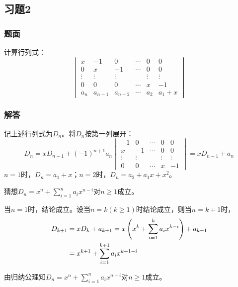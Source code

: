 \documentclass[9pt,xcolor=svgnames]{beamer} %
\begin{document}
\subsection*{习题2}
\begin{frame}
    \frametitle{题面}
    计算行列式：
    \begin{equation*}
        \begin{vmatrix}
            x      & -1      & 0       & \cdots & 0      & 0      \\
            0      & x       & -1      & \cdots & 0      & 0      \\
            \vdots & \vdots  & \vdots  &        & \vdots & \vdots \\
            0      & 0       & 0       & \cdots & x      & -1     \\
            a_n    & a_{n-1} & a_{n-2} & \cdots & a_2    & a_1+x
        \end{vmatrix}
    \end{equation*}
\end{frame}
\begin{frame}
    \frametitle{解答}

    记上述行列式为\(D_n\)。将\(D_n\)按第一列展开：
    \begin{equation*}
        D_n  =xD_{n-1}+(-1)^{n+1}a_n
        \begin{vmatrix}
            -1     & 0      & \cdots & 0      & 0      \\
            x      & -1     & \cdots & 0      & 0      \\
            \vdots & \vdots &        & \vdots & \vdots \\
            0      & 0      & \cdots & x      & -1
        \end{vmatrix}
        =xD_{n-1}+a_n
    \end{equation*}
    \(n=1\)时，\(D_n=a_1+x\)；\(n=2\)时，\(D_n=a_2+a_1x+x^2\)。

    猜想\(D_n=x^n+\sum_{i=1}^{n}a_ix^{n-i}\)对\(n\geq1\)成立。

    当\(n=1\)时，结论成立。设当\(n=k\)\((k\geq1)\)时结论成立，则当\(n=k+1\)时，
    \begin{align*}
        D_{k+1} & =xD_k+a_{k+1}=x\left( x^k+\sum_{i=1}^{k}a_ix^{k-i} \right)+a_{k+1} \\
                & =x^{k+1}+\sum_{i=1}^{k+1}a_ix^{k+1-i}
    \end{align*}

    由归纳公理知\(D_n=x^n+\sum_{i=1}^{n}a_ix^{n-i}\)对\(n\geq1\)成立。

\end{frame}
\end{document}
